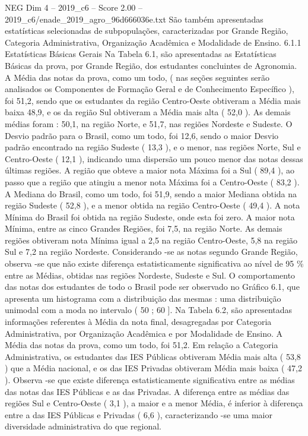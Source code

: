 \begin{textsample}{NEG Dim 4 – 2019\_c6 – Score 2.00 – 2019\_c6/enade\_2019\_agro\_96d666036e.txt}
São também apresentadas estatísticas selecionadas de subpopulações, caracterizadas por Grande Região, Categoria Administrativa, Organização Acadêmica e Modalidade de Ensino. 6.1.1 Estatísticas Básicas Gerais Na Tabela 6.1, são apresentadas as Estatísticas Básicas da prova, por Grande Região, dos estudantes concluintes de Agronomia.
A Média das notas da prova, como um todo, ( nas seções seguintes serão analisados os Componentes de Formação Geral e de Conhecimento Específico ), foi 51,2, sendo que os estudantes da região Centro-Oeste obtiveram a Média mais baixa 48,9, e os da região Sul obtiveram a Média mais alta ( 52,0 ).
As demais médias foram : 50,1, na região Norte, e 51,7, nas regiões Nordeste e Sudeste.
O Desvio padrão para o Brasil, como um todo, foi 12,6, sendo o maior Desvio padrão encontrado na região Sudeste ( 13,3 ), e o menor, nas regiões Norte, Sul e Centro-Oeste ( 12,1 ), indicando uma dispersão um pouco menor das notas dessas últimas regiões.
A região que obteve a maior nota Máxima foi a Sul ( 89,4 ), ao passo que a região que atingiu a menor nota Máxima foi a Centro-Oeste ( 83,2 ).
A Mediana do Brasil, como um todo, foi 51,9, sendo a maior Mediana obtida na região Sudeste ( 52,8 ), e a menor obtida na região Centro-Oeste ( 49,4 ).
A nota Mínima do Brasil foi obtida na região Sudeste, onde esta foi zero.
A maior nota Mínima, entre as cinco Grandes Regiões, foi 7,5, na região Norte.
As demais regiões obtiveram nota Mínima igual a 2,5 na região Centro-Oeste, 5,8 na região Sul e 7,2 na região Nordeste.
Considerando -se as notas segundo Grande Região, observa -se que não existe diferença estatisticamente significativa ao nível de 95 \% entre as Médias, obtidas nas regiões Nordeste, Sudeste e Sul.
O comportamento das notas dos estudantes de todo o Brasil pode ser observado no Gráfico 6.1, que apresenta um histograma com a distribuição das mesmas : uma distribuição unimodal com a moda no intervalo ( 50 ; 60 ].
Na Tabela 6.2, são apresentadas informações referentes à Média da nota final, desagregadas por Categoria Administrativa, por Organização Acadêmica e por Modalidade de Ensino.
A Média das notas da prova, como um todo, foi 51,2.
Em relação a Categoria Administrativa, os estudantes das IES Públicas obtiveram Média mais alta ( 53,8 ) que a Média nacional, e os das IES Privadas obtiveram Média mais baixa ( 47,2 ).
Observa -se que existe diferença estatisticamente significativa entre as médias das notas das IES Públicas e as das Privadas.
A diferença entre as médias das regiões Sul e Centro-Oeste ( 3,1 ), a maior e a menor Média, é inferior à diferença entre a das IES Públicas e Privadas ( 6,6 ), caracterizando -se uma maior diversidade administrativa do que regional.

\end{textsample}
